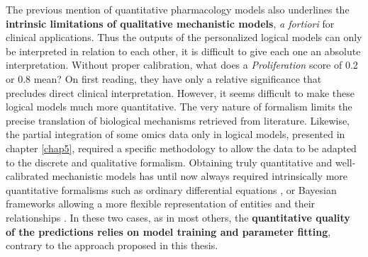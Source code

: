 \documentclass[a4paper,12pt,twoside,onecolumn,openright,final,oldfontcommands]{memoir}
\begin{document}
The previous mention of quantitative pharmacology models also underlines
the \textbf{intrinsic limitations of qualitative mechanistic models},
\emph{a fortiori} for clinical applications. Thus the outputs of the
personalized logical models can only be interpreted in relation to each
other, it is difficult to give each one an absolute interpretation.
Without proper calibration, what does a \emph{Proliferation} score of
0.2 or 0.8 mean? On first reading, they have only a relative
significance that precludes direct clinical interpretation. However, it
seems difficult to make these logical models much more quantitative. The
very nature of formalism limits the precise translation of biological
mechanisms retrieved from literature. Likewise, the partial integration
of some omics data only in logical models, presented in chapter
\ref{chap5}, required a specific methodology to allow the data to be
adapted to the discrete and qualitative formalism. Obtaining truly
quantitative and well-calibrated mechanistic models has until now always
required intrinsically more quantitative formalisms such as ordinary
differential equations \citep{frohlich2018efficient}, or Bayesian
frameworks allowing a more flexible representation of entities and their
relationships \citep{jastrzebski2018integrative}. In these two cases, as
in most others, the \textbf{quantitative quality of the predictions
relies on model training and parameter fitting}, contrary to the
approach proposed in this thesis.
\end{document}
